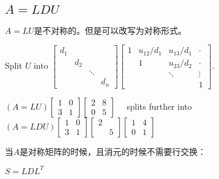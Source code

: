 \subsection{$A = LDU$}

$A=LU$是不对称的。但是可以改写为对称形式。

Split $ U $ into $ \left[\begin{array}{cccc}d_{1} & & & \\ & d_{2} & & \\ & & \ddots & \\ & & & d_{n}\end{array}\right]\left[\begin{array}{cccc}1 & u_{12} / d_{1} & u_{13} / d_{1} & \cdot \\ & 1 & u_{23} / d_{2} & \cdot \\ & & \ddots & \vdots \\ & & & 1\end{array}\right] $.

\begin{example}
    \begin{center}
        $(A= LU) \left[\begin{array}{ll}1 & 0 \\ 3 & 1\end{array}\right]\left[\begin{array}{ll}2 & 8 \\ 0 & 5\end{array}\right] \quad $ splits further into $(A= LDU) \left[\begin{array}{ll}1 & 0 \\ 3 & 1\end{array}\right]\left[\begin{array}{ll}2 & \\ & 5\end{array}\right]\left[\begin{array}{ll}1 & 4 \\ 0 & 1\end{array}\right] $
    \end{center}
\end{example}

\begin{theorem}
    当$A$是对称矩阵的时候，且消元的时候不需要行交换：

    $S = LDL^T$
\end{theorem}


